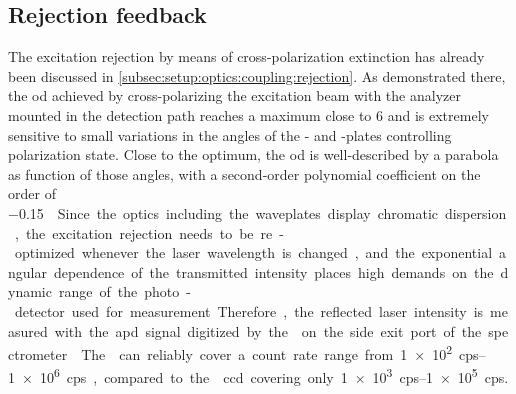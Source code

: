 \subsection{Rejection feedback}\label{subsec:sec:exp:mjolnir:calibration:rejection}
The excitation rejection by means of cross-polarization extinction has already been discussed in \cref{subsec:setup:optics:coupling:rejection}.
As demonstrated there, the \gls{od} achieved by cross-polarizing the excitation beam with the analyzer mounted in the detection path reaches a maximum close to \num{6} and is extremely sensitive to small variations in the angles of the \quarterwave- and \halfwave-plates controlling polarization state.
Close to the optimum, the \gls{od} is well-described by a parabola as function of those angles, with a second-order polynomial coefficient on the order of \qty[per-mode = symbol]{-0.15}{\per\square\milli\txtdegree}.
Since the optics including the waveplates display chromatic dispersion, the excitation rejection needs to be re-optimized whenever the laser wavelength is changed, and the exponential angular dependence of the transmitted intensity places high demands on the dynamic range of the photo-detector used for measurement.
Therefore, the reflected laser intensity is measured with the \gls{apd} signal digitized by the \tagger on the side exit port of the spectrometer.
The \taggershort can reliably cover a count rate range from \qtyrange{1e2}{1e6}{cps}, compared to the \theccd \gls{ccd} covering only \qtyrange{1e3}{1e5}{cps}.

